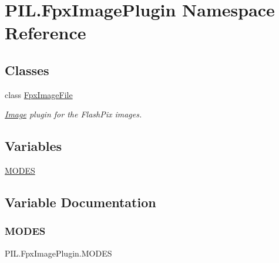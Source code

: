 \hypertarget{namespacePIL_1_1FpxImagePlugin}{}\section{P\+I\+L.\+Fpx\+Image\+Plugin Namespace Reference}
\label{namespacePIL_1_1FpxImagePlugin}
\subsection*{Classes}
\begin{DoxyCompactItemize}
\item 
class \hyperlink{classPIL_1_1FpxImagePlugin_1_1FpxImageFile}{Fpx\+Image\+File}
\begin{DoxyCompactList}\small\item\em \hyperlink{namespacePIL_1_1Image}{Image} plugin for the Flash\+Pix images. \end{DoxyCompactList}\end{DoxyCompactItemize}
\subsection*{Variables}
\begin{DoxyCompactItemize}
\item 
\hyperlink{namespacePIL_1_1FpxImagePlugin_acb04ddb6feb17d3c3ef46c722da4bb2f}{M\+O\+D\+ES}
\end{DoxyCompactItemize}


\subsection{Variable Documentation}
\mbox{\label{namespacePIL_1_1FpxImagePlugin_acb04ddb6feb17d3c3ef46c722da4bb2f}} 
\subsubsection{\texorpdfstring{M\+O\+D\+ES}{MODES}}
{\footnotesize\ttfamily P\+I\+L.\+Fpx\+Image\+Plugin.\+M\+O\+D\+ES}

